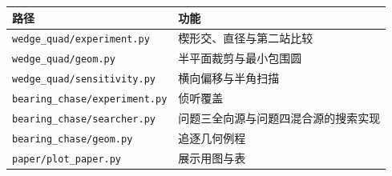 \documentclass{cumcmthesis}
\begin{document}
{\small
\begin{tabular}{ll}
\toprule
路径 & 功能 \\
\midrule
\texttt{wedge\_quad/experiment.py} & 楔形交、直径与第二站比较 \\
\texttt{wedge\_quad/geom.py} & 半平面裁剪与最小包围圆 \\
\texttt{wedge\_quad/sensitivity.py} & 横向偏移与半角扫描 \\
\texttt{bearing\_chase/experiment.py} & 侦听覆盖 \\
\texttt{bearing\_chase/searcher.py} & 问题三全向源与问题四混合源的搜索实现 \\
\texttt{bearing\_chase/geom.py} & 追逐几何例程 \\
\texttt{paper/plot\_paper.py} & 展示用图与表 \\
\bottomrule
\end{tabular}
}
\end{document}
